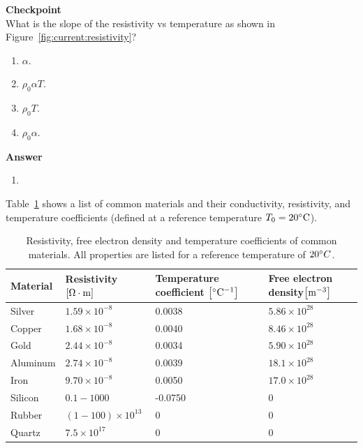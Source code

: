 \begin{framed}
\textbf{Checkpoint}\\
What is the slope of the resistivity vs temperature as shown in Figure~\ref{fig:current:resistivity}?

\begin{enumerate}
\item $\alpha$.
\item $\rho_0 \alpha T$.
\item $\rho_0 T$.
\item $\rho_0 \alpha$.
\end{enumerate}

\begin{framed}
\textbf{Answer}\\
\begin{enumerate}[resume]
\item
\end{enumerate}
\end{framed}
\end{framed}

Table~\ref{tab:current:materials} shows a list of common materials and their conductivity, resistivity, and temperature coefficients (defined at a reference temperature $T_0=20 {\rm \degree C}$).

\begin{table}
\centering
\caption[]{Resistivity, free electron density and temperature coefficients of common materials. All properties are listed for a reference temperature of $20 {\rm \degree}C$.}
\label{tab:current:materials}
\begin{tabular}{p{}p{}p{}p{}}
\toprule
\textbf{Material} & \textbf{Resistivity} ${\rm \left[{\Omega\cdot m}\right]}$ & \textbf{Temperature coefficient} ${\rm \left[{\degree C^{ -1}}\right]}$ & \textbf{Free electron density}${\rm \left[{m^{ -3}}\right]}$ \\
\hline
Silver & $1.59\times 10^{ -8}$ & 0.0038 & $5.86\times 10^{28}$ \\
Copper & $1.68\times 10^{ -8}$ & 0.0040 & $8.46\times 10^{28}$ \\
Gold & $2.44\times 10^{ -8}$ & 0.0034 & $5.90\times 10^{28}$ \\
Aluminum & $2.74\times 10^{ -8}$ & 0.0039 & $18.1\times 10^{28}$ \\
Iron & $9.70\times 10^{ -8}$ & 0.0050 & $17.0\times 10^{28}$ \\
Silicon & $0.1 -1000$ & -0.0750 & 0 \\
Rubber & $(1 -100)\times 10^{13}$ & 0 & 0 \\
Quartz & $7.5\times 10^{17}$ & 0 & 0 \\
\bottomrule
\end{tabular}
\end{table}

